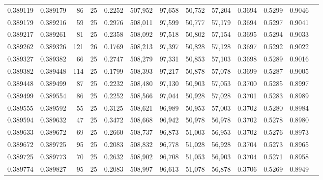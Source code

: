 \begin{tabular}{rrrrrrrrrrrrr}
0.389119 & 0.389179 &    86 &  25 &                                     0.2252 & 507,952 &  97,658 &  50,752 &  57,204 & 0.3694 & 0.5299 & 0.9046 \\
0.389179 & 0.389216 &    59 &  25 &                                     0.2976 & 508,011 &  97,599 &  50,777 &  57,179 & 0.3694 & 0.5297 & 0.9041 \\
0.389217 & 0.389261 &    81 &  25 &                                     0.2358 & 508,092 &  97,518 &  50,802 &  57,154 & 0.3695 & 0.5294 & 0.9033 \\
0.389262 & 0.389326 &   121 &  26 &                                     0.1769 & 508,213 &  97,397 &  50,828 &  57,128 & 0.3697 & 0.5292 & 0.9022 \\
0.389327 & 0.389382 &    66 &  25 &                                     0.2747 & 508,279 &  97,331 &  50,853 &  57,103 & 0.3698 & 0.5289 & 0.9016 \\
0.389382 & 0.389448 &   114 &  25 &                                     0.1799 & 508,393 &  97,217 &  50,878 &  57,078 & 0.3699 & 0.5287 & 0.9005 \\
0.389448 & 0.389499 &    87 &  25 &                                     0.2232 & 508,480 &  97,130 &  50,903 &  57,053 & 0.3700 & 0.5285 & 0.8997 \\
0.389499 & 0.389554 &    86 &  25 &                                     0.2252 & 508,566 &  97,044 &  50,928 &  57,028 & 0.3701 & 0.5283 & 0.8989 \\
0.389555 & 0.389592 &    55 &  25 &                                     0.3125 & 508,621 &  96,989 &  50,953 &  57,003 & 0.3702 & 0.5280 & 0.8984 \\
0.389594 & 0.389632 &    47 &  25 &                                     0.3472 & 508,668 &  96,942 &  50,978 &  56,978 & 0.3702 & 0.5278 & 0.8980 \\
0.389633 & 0.389672 &    69 &  25 &                                     0.2660 & 508,737 &  96,873 &  51,003 &  56,953 & 0.3702 & 0.5276 & 0.8973 \\
0.389672 & 0.389725 &    95 &  25 &                                     0.2083 & 508,832 &  96,778 &  51,028 &  56,928 & 0.3704 & 0.5273 & 0.8965 \\
0.389725 & 0.389773 &    70 &  25 &                                     0.2632 & 508,902 &  96,708 &  51,053 &  56,903 & 0.3704 & 0.5271 & 0.8958 \\
0.389774 & 0.389827 &    95 &  25 &                                     0.2083 & 508,997 &  96,613 &  51,078 &  56,878 & 0.3706 & 0.5269 & 0.8949 \\

\end{tabular}
